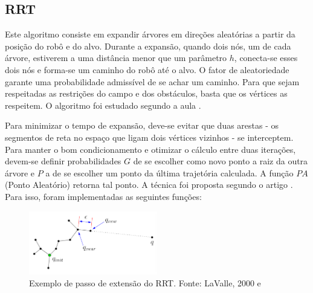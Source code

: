 \documentclass[a4paper,12pt]{article}
\begin{document}
\subsection{RRT}

Este algoritmo consiste em expandir árvores em direções aleatórias a partir da posição do robô e do alvo. Durante a expansão, quando dois nós, um de cada árvore, estiverem a uma distância menor que um parâmetro $h$, conecta-se esses dois nós e forma-se um caminho do robô até o alvo. O fator de aleatoriedade garante uma probabilidade admissível de se achar um caminho. Para que sejam respeitadas as restrições do campo e dos obstáculos, basta que os vértices as respeitem. O algoritmo foi estudado segundo a aula \cite{lavalle2011}.

Para minimizar o tempo de expansão, deve-se evitar que duas arestas - os segmentos de reta no espaço que ligam dois vértices vizinhos - se interceptem. Para manter o bom condicionamento e otimizar o cálculo entre duas iterações, devem-se definir probabilidades $G$ de se escolher como novo ponto a raiz da outra árvore e $P$ a de se escolher um ponto da última trajetória calculada. A função $PA$ (Ponto Aleatório) retorna tal ponto. A técnica foi proposta segundo o artigo \cite{james2002}. Para isso, foram implementadas as seguintes funções:

\begin{figure}
	\label{fig: rrt_extend}
	\centering
	\includegraphics[width=0.5\textwidth]{figures/RRT.png}
   \caption{Exemplo de passo de extensão do RRT. Fonte: LaValle, 2000 e \cite{lavalle2011}}
\end{figure}

\makeatletter
\def\BState{\State\hskip-\ALG@thistlm}
\makeatother
\end{document}
